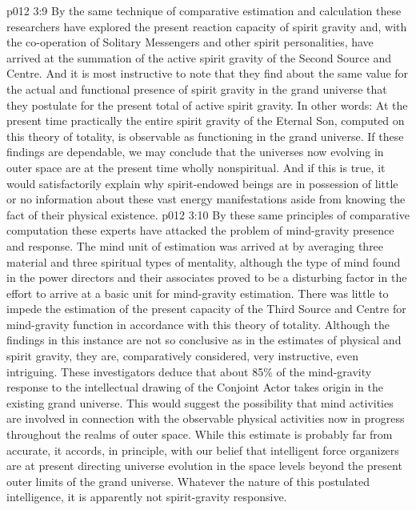 \vs p012 3:9 \bibnobreakspace {} By the same technique of comparative estimation and calculation these researchers have explored the present reaction capacity of spirit gravity and, with the co\hyp{}operation of Solitary Messengers and other spirit personalities, have arrived at the summation of the active spirit gravity of the Second Source and Centre. And it is most instructive to note that they find about the same value for the actual and functional presence of spirit gravity in the grand universe that they postulate for the present total of active spirit gravity. In other words: At the present time practically the entire spirit gravity of the Eternal Son, computed on this theory of totality, is observable as functioning in the grand universe. If these findings are dependable, we may conclude that the universes now evolving in outer space are at the present time wholly nonspiritual. And if this is true, it would satisfactorily explain why spirit\hyp{}endowed beings are in possession of little or no information about these vast energy manifestations aside from knowing the fact of their physical existence.
\vs p012 3:10 \bibnobreakspace {} By these same principles of comparative computation these experts have attacked the problem of mind\hyp{}gravity presence and response. The mind unit of estimation was arrived at by averaging three material and three spiritual types of mentality, although the type of mind found in the power directors and their associates proved to be a disturbing factor in the effort to arrive at a basic unit for mind\hyp{}gravity estimation. There was little to impede the estimation of the present capacity of the Third Source and Centre for mind\hyp{}gravity function in accordance with this theory of totality. Although the findings in this instance are not so conclusive as in the estimates of physical and spirit gravity, they are, comparatively considered, very instructive, even intriguing. These investigators deduce that about 85\% of the mind\hyp{}gravity response to the intellectual drawing of the Conjoint Actor takes origin in the existing grand universe. This would suggest the possibility that mind activities are involved in connection with the observable physical activities now in progress throughout the realms of outer space. While this estimate is probably far from accurate, it accords, in principle, with our belief that intelligent force organizers are at present directing universe evolution in the space levels beyond the present outer limits of the grand universe. Whatever the nature of this postulated intelligence, it is apparently not spirit\hyp{}gravity responsive.
